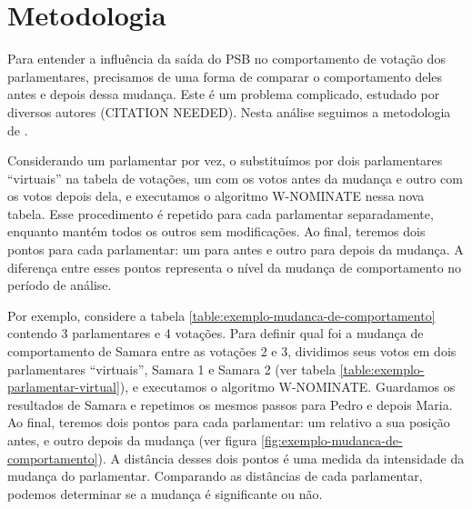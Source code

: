 \section{Metodologia}{\label{sec:analise-saida-psb:metodologia}

Para entender a influência da saída do PSB no comportamento de votação dos
parlamentares, precisamos de uma forma de comparar o comportamento deles antes
e depois dessa mudança. Este é um problema complicado, estudado por diversos
autores (CITATION NEEDED). Nesta análise seguimos a metodologia de
\cite{Poole2005}.

Considerando um parlamentar por vez, o substituímos por dois parlamentares
``virtuais'' na tabela de votações, um com os votos antes da mudança e outro
com os votos depois dela, e executamos o algoritmo W-NOMINATE nessa nova
tabela. Esse procedimento é repetido para cada parlamentar separadamente,
enquanto mantém todos os outros sem modificações. Ao final, teremos dois pontos
para cada parlamentar: um para antes e outro para depois da mudança. A
diferença entre esses pontos representa o nível da mudança de comportamento no
período de análise. 

Por exemplo, considere a tabela \ref{table:exemplo-mudanca-de-comportamento}
contendo 3 parlamentares e 4 votações. Para definir qual foi a mudança de
comportamento de Samara entre as votações 2 e 3, dividimos seus votos em dois
parlamentares ``virtuais'', Samara 1 e Samara 2 (ver tabela
\ref{table:exemplo-parlamentar-virtual}), e executamos o algoritmo W-NOMINATE.
Guardamos os resultados de Samara e repetimos os mesmos passos para Pedro e
depois Maria. Ao final, teremos dois pontos para cada parlamentar: um relativo
a sua posição antes, e outro depois da mudança (ver figura
\ref{fig:exemplo-mudanca-de-comportamento}). A distância desses dois pontos é
uma medida da intensidade da mudança do parlamentar.  Comparando as distâncias
de cada parlamentar, podemos determinar se a mudança é significante ou não.


}
